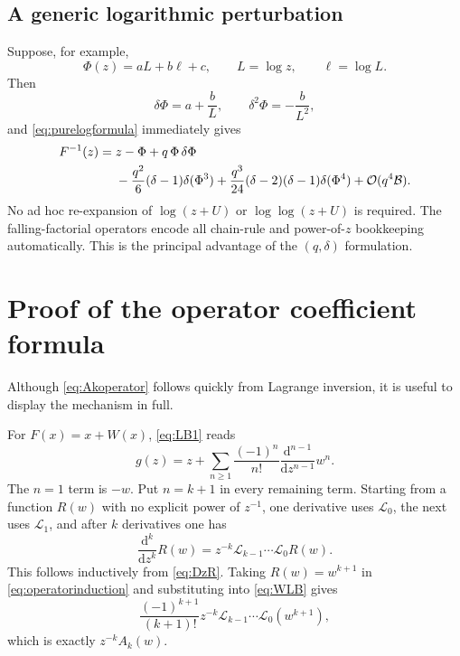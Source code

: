 \documentclass[11pt]{article}
\theoremstyle{clean}
\newcommand{\bigO}{\mathcal O}
\begin{document}
\subsection{A generic logarithmic perturbation}

Suppose, for example,
\begin{equation}\label{eq:genericPhi}
  \Phi(z)=aL+b\ell+c,
  \qquad L=\log z,
  \qquad \ell=\log L.
\end{equation}
Then
\[
  \delta\Phi=a+\frac{b}{L},
  \qquad
  \delta^2\Phi=-\frac{b}{L^2},
\]
and \cref{eq:purelogformula} immediately gives
\begin{align}
 F^{-1}(z)={}&z-\Phi
 +q\,\Phi\,\delta\Phi\notag\\
 &-\frac{q^2}{6}(\delta-1)\delta(\Phi^3)
 +\frac{q^3}{24}(\delta-2)(\delta-1)\delta(\Phi^4)
 +\bigO(q^4\mathcal B).
 \label{eq:genericreverse}
\end{align}
No ad hoc re-expansion of \(\log(z+U)\) or \(\log\log(z+U)\) is required.
The falling-factorial operators encode all chain-rule and power-of-\(z\)
bookkeeping automatically.  This is the principal advantage of the
\((q,\delta)\) formulation.

\section{Proof of the operator coefficient formula}

Although \cref{eq:Akoperator} follows quickly from Lagrange inversion, it is
useful to display the mechanism in full.

For \(F(x)=x+W(x)\), \cref{eq:LB1} reads
\begin{equation}\label{eq:WLB}
  g(z)=z+\sum_{n\ge1}\frac{(-1)^n}{n!}
  \frac{\mathrm d^{n-1}}{\mathrm dz^{n-1}}w^n.
\end{equation}
The \(n=1\) term is \(-w\).  Put \(n=k+1\) in every remaining term.  Starting
from a function \(R(w)\) with no explicit power of \(z^{-1}\), one derivative
uses \(\mathcal L_0\), the next uses \(\mathcal L_1\), and after \(k\)
derivatives one has
\begin{equation}\label{eq:operatorinduction}
  \frac{\mathrm d^k}{\mathrm dz^k}R(w)
  =z^{-k}\mathcal L_{k-1}\cdots\mathcal L_0R(w).
\end{equation}
This follows inductively from \cref{eq:DzR}.  Taking \(R(w)=w^{k+1}\) in
\cref{eq:operatorinduction} and substituting into \cref{eq:WLB} gives
\[
 \frac{(-1)^{k+1}}{(k+1)!}z^{-k}
 \mathcal L_{k-1}\cdots\mathcal L_0(w^{k+1}),
\]
which is exactly \(z^{-k}A_k(w)\).
\end{document}
